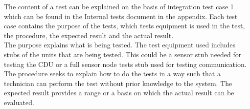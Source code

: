 The content of a test can be explained on the basis of integration test case 1 which can be found in the Internal tests document in the appendix. Each test case contains the purpose of the tests, which tests equipment is used in the test, the procedure, the expected result and the actual result.\\ 
The purpose explains what is being tested. The test equipment used includes stubs of the units that are being tested. This could be a sensor stub needed for testing the CDU or a full sensor node tests stub used for testing communication. The procedure seeks to explain how to do the tests in a way such that a technician can perform the test without prior knowledge to the system. The expected result provides a range or a basis on which the actual result can be evaluated.\\